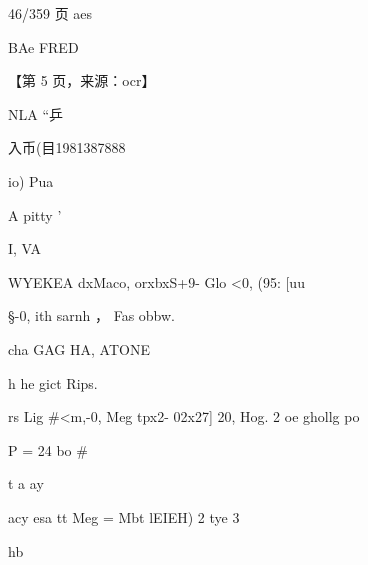 \documentclass[UTF8,12pt,a4paper,openany]{ctexbook}
\begin{document}
\begin{enumerate}[label=\textbf{\arabic*.},leftmargin=2em]
46/359 页                            aes\par BAe FRED\par \par 【第 5 页，来源：ocr】\par NLA “乒\par 入币(目1981387888\par io)       Pua\par A pitty                            '\par I,          VA\par WYEKEA dxMaco, orxbxS+9- Glo <0, (95: [uu\par §-0,  ith sarnh ， Fas obbw.\par cha GAG HA, ATONE\par h he gict Rips.\par rs  Lig \#<m,-0, Meg tpx2- 02x27] 20, Hog. 2 oe ghollg po\par P    = 24 bo     \#\par t   a                             ay\par acy esa tt Meg = Mbt lEIEH) 2 tye 3\par hb
\end{enumerate}
\end{document}
